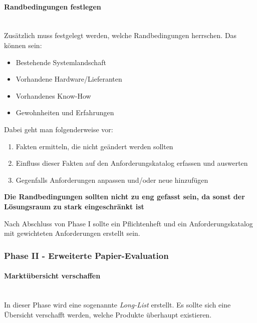\documentclass[a4paper, 11pt]{article}
\begin{document}
\paragraph{Randbedingungen festlegen}\mbox{}\\
Zusätzlich muss festgelegt werden, welche Randbedingungen herrschen. Das können sein:
\begin{multicols}{2}
	\begin{itemize}
		\item Bestehende Systemlandschaft
		\item Vorhandene Hardware/Lieferanten
		\item Vorhandenes Know-How
		\item Gewohnheiten und Erfahrungen
	\end{itemize}
\end{multicols}

\noindent Dabei geht man folgenderweise vor:

\begin{enumerate}
	\item Fakten ermitteln, die nicht geändert werden sollten
	\item Einfluss dieser Fakten auf den Anforderungskatalog erfassen und auswerten
	\item Gegenfalls Anforderungen anpassen und/oder neue hinzufügen
\end{enumerate}

\noindent \textbf{Die Randbedingungen sollten nicht zu eng gefasst sein, da sonst der Lösungsraum zu stark eingeschränkt ist}

\vspace{10px}

\noindent Nach Abschluss von Phase I sollte ein Pflichtenheft und ein Anforderungskatalog mit gewichteten Anforderungen erstellt sein.

\subsubsection{Phase II - Erweiterte Papier-Evaluation}

\paragraph{Marktübersicht verschaffen}\mbox{}\\
In dieser Phase wird eine sogenannte \textit{Long-List} erstellt. Es sollte sich eine Übersicht verschafft werden, welche Produkte überhaupt existieren.
\end{document}
